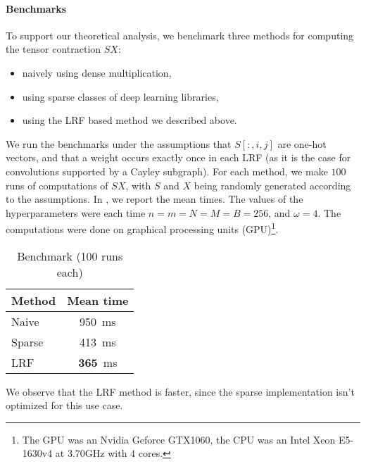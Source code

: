 \paragraph{Benchmarks}
To support our theoretical analysis, we benchmark three methods for computing the tensor contraction $SX$:
\begin{itemize}
  \item naively using dense multiplication,
  \item using sparse classes of deep learning libraries,
  \item using the LRF based method we described above.
\end{itemize}

We run the benchmarks under the assumptions that $S[:,i,j]$ are one-hot vectors, and that a weight occurs exactly once in each LRF (as it is the case for convolutions supported by a Cayley subgraph). For each method, we make $100$ runs of computations of $SX$, with $S$ and $X$ being randomly generated according to the assumptions. In , we report the mean times. The values of the hyperparameters were each time $n = m = N = M = B = 256$, and $\omega = 4$. The computations were done on graphical processing units (GPU)\footnote{The GPU was an Nvidia Geforce GTX1060, the CPU was an Intel Xeon E5-1630v4 at 3.70GHz with 4 cores.}.

\begin{table}[H]
  \centering
\begin{tabular}{lc}
  Method & Mean time\\
  \hline
  Naive & 950~ms\\
  Sparse & 413~ms\\
  LRF & \textbf{365}~ms
\end{tabular}
\caption{Benchmark (100 runs each)}
\label{tab:ben}
\end{table}

We observe that the LRF method is faster, since the sparse implementation isn't optimized for this use case.


